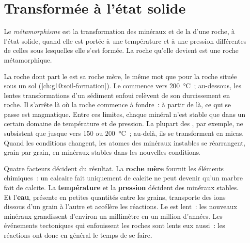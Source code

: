 \section{Transformée à l'état solide}

\begin{definition}[Métamorphisme]\label{def:g12:metamorphic-rocks:metamorphism}
Le \emph{métamorphisme} est la
transformation des minéraux et de la  d'une roche, à l'état solide,
quand elle est portée à une température et à une pression différentes de
celles sous lesquelles elle s'est formée. La roche qu'elle devient est une
roche métamorphique.
\end{definition}

La roche dont part le  est sa roche mère, le même mot que pour
la roche située sous un sol (\cref{ch:g10:soil-formation}). Le
 commence vers \qty{200}{\celsius}~; au-dessous, les lentes
transformations d'un sédiment enfoui relèvent de son durcissement en roche.
Il s'arrête là où la roche commence à fondre~: à partir de là, ce qui se
passe est magmatique. Entre ces limites, chaque minéral n'est stable que
dans un certain domaine de température et de pression. La plupart des
, par exemple, ne subsistent que jusque vers 150 ou
\qty{200}{\celsius}~; au-delà, ils se transforment en micas. Quand les
conditions changent, les atomes des minéraux instables se réarrangent, grain
par grain, en minéraux stables dans les nouvelles conditions.

Quatre facteurs décident du résultat. La \textbf{roche mère} fournit les
éléments chimiques~: un calcaire fait uniquement de calcite ne peut devenir
qu'un marbre fait de calcite. La \textbf{température} et la
\textbf{pression} décident des minéraux stables. Et l'\textbf{eau}, présente
en petites quantités entre les grains, transporte des ions dissous d'un
grain à l'autre et accélère les réactions. Le  est lent~: les
nouveaux minéraux grandissent d'environ un millimètre en un million
d'années. Les événements tectoniques qui enfouissent les roches sont lents
eux aussi~: les réactions ont donc en général le temps de se faire.

